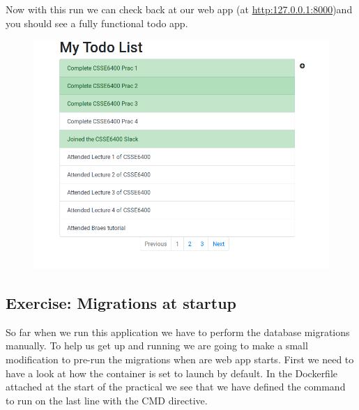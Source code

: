 \documentclass{csse4400}
\begin{document}
\noindent Now with this run we can check back at our web app (at \url{http:127.0.0.1:8000})and you should see a fully functional todo app.

\begin{figure}[ht]
\includegraphics[width=\textwidth]{images/todoapp}
\end{figure}


\subsection{Exercise: Migrations at startup}

So far when we run this application we have to perform the database migrations manually. 
To help us get up and running we are going to make a small modification to pre-run the migrations when are web app starts.
First we need to have a look at how the container is set to launch by default.
In the Dockerfile attached at the start of the practical we see that we have defined the command to run on the last line with the CMD directive.
\end{document}
